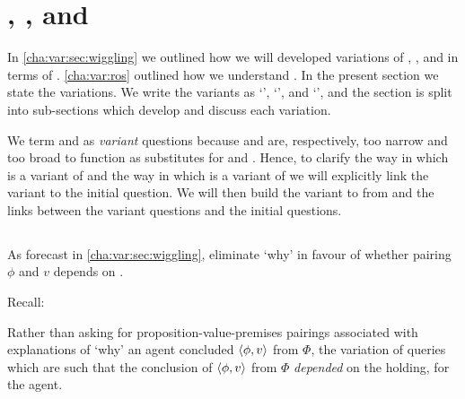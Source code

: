 \section{\qWhyV{}, \qHowV{}, and \issueConstraint{}}
\label{cha:var:sec:vars}

\begin{note}
  In \autoref{cha:var:sec:wiggling} we outlined how we will developed variations of \qWhy{}, \qHow{}, and \issueInclusion{} in terms of \ros{}.
  \autoref{cha:var:ros} outlined how we understand .
  In the present section we state the variations.
  We write the variants as `\qWhyV{}', `\qHowV{}', and `\issueConstraint{}', and the section is split into sub-sections which develop and discuss each variation.


  We term \qWhyV{} and \qHowV{} as \emph{variant} questions because \qWhyV{} and \qHowV{} are, respectively, too narrow and too broad to function as substitutes for \qWhy{} and \qHow{}.
  Hence, to clarify the way in which \qWhyV{} is a variant of \qWhy{} and the way in which \qHowV{} is a variant of \qHow{} we will explicitly link the variant to the initial question.
  We will then build the variant to \issueInclusion{} from \issueInclusion{} and the links between the variant questions and the initial questions.
\end{note}

\subsection{\qWhyV{}}
\label{cha:var:sec:vars:qwhyvnp}

\begin{note}
  As forecast in \autoref{cha:var:sec:wiggling}, eliminate `why' in favour of whether pairing \(\phi\) and \(v\) depends on \ros{}.

  Recall:
  \begin{quote}%
    \vspace{-1.5\baselineskip}%
    \questionWhyBasic*
  \end{quote}

  Rather than asking for proposition-value-premises pairings associated with explanations of `why' an agent concluded \(\langle \phi, v \rangle\) from \(\Phi\), the variation of \qWhy{} queries which  are such that the conclusion of \(\langle \phi, v \rangle\) from \(\Phi\) \emph{depended} on the  holding, for the agent.
  \end{note}

